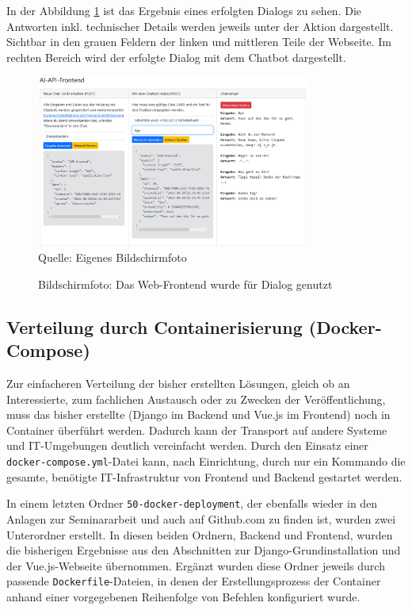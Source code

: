 \documentclass[12pt,oneside,titlepage,listof=totoc,bibliography=totoc]{scrartcl}
\newcommand{\code}[1]{\colorbox{code-gray}{\texttt{#1}}}
\begin{document}
In der Abbildung \ref{fig:web-frontend-genutzt} ist das Ergebnis eines erfolgten Dialogs zu sehen. Die Antworten inkl. technischer Details werden jeweils unter der Aktion dargestellt. Sichtbar in den grauen Feldern der linken und mittleren Teile der Webseite. Im rechten Bereich wird der erfolgte Dialog mit dem Chatbot dargestellt.


\begin{figure}[H]
	\caption{Bildschirmfoto: Das Web-Frontend wurde für Dialog genutzt}\label{fig:web-frontend-genutzt}
	\includegraphics[width=0.8\textwidth]{web-frontend-genutzt.png}
	\\
	Quelle: Eigenes Bildschirmfoto
\end{figure}


\subsection{Verteilung durch Containerisierung (Docker-Compose)}

Zur einfacheren Verteilung der bisher erstellten Lösungen, gleich ob an Interessierte, zum fachlichen  Austausch oder zu Zwecken der Veröffentlichung, muss das bisher erstellte (Django im Backend und Vue.js im Frontend) noch in Container überführt werden. Dadurch kann der Transport auf andere Systeme und IT-Umgebungen deutlich vereinfacht werden. Durch den Einsatz einer \code{docker-compose.yml}-Datei kann, nach Einrichtung, durch nur ein Kommando die gesamte, benötigte IT-Infrastruktur von  Frontend und Backend gestartet werden.

In einem letzten Ordner \code{50-docker-deployment}, der ebenfalls wieder in den Anlagen zur Seminararbeit und auch auf Github.com zu finden ist, wurden zwei Unterordner erstellt. In diesen beiden Ordnern, Backend und Frontend, wurden die bisherigen Ergebnisse aus den Abschnitten zur Django-Grundinstallation und der Vue.js-Webseite übernommen. Ergänzt wurden diese Ordner jeweils durch passende \code{Dockerfile}-Dateien, in denen der Erstellungsprozess der Container anhand einer vorgegebenen Reihenfolge von Befehlen konfiguriert wurde. 
\end{document}
